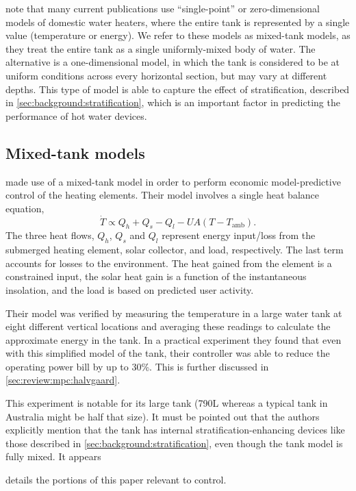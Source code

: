 \textcite{Vrettos12} note that many current publications use ``single-point'' or zero-dimensional models of domestic water heaters, where the entire tank is represented by a single value (temperature or energy).
We refer to these models as mixed-tank models, as they treat the entire tank as a single uniformly-mixed body of water.
The alternative is a one-dimensional model, in which the tank is considered to be at uniform conditions across every horizontal section, but may vary at different depths.
This type of model is able to capture the effect of stratification, described in \autoref{sec:background:stratification}, which is an important factor in predicting the performance of hot water devices.

\subsection{Mixed-tank models}
\label{sec:review:mixed-tank}

\textcite{Halvgaard12} made use of a mixed-tank model in order to perform economic model-predictive control of the heating elements.
Their model involves a single heat balance equation,
$$ \dot{T} \propto Q_h + Q_s - Q_l - UA (T - T_{\text{amb}}). $$
The three heat flows, $Q_h$, $Q_s$ and $Q_l$ represent energy input/loss from the submerged heating element, solar collector, and load, respectively.
The last term accounts for losses to the environment.
The heat gained from the element is a constrained input, the solar heat gain is a function of the instantaneous insolation, and the load is based on predicted user activity.

Their model was verified by measuring the temperature in a large water tank at eight different vertical locations and averaging these readings to calculate the approximate energy in the tank.
In a practical experiment they found that even with this simplified model of the tank, their controller was able to reduce the operating power bill by up to 30\%.
This is further discussed in \autoref{sec:review:mpc:halvgaard}.

This experiment is notable for its large tank (790L whereas a typical tank in Australia might be half that size).
It must be pointed out that the authors explicitly mention that the tank has internal stratification-enhancing devices like those described in \autoref{sec:background:stratification}, even though the tank model is fully mixed.
It appears 

 details the portions of this paper relevant to control.

